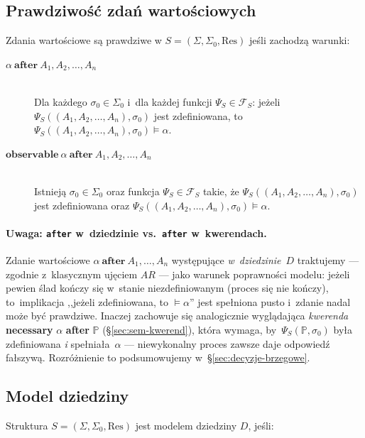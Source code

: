 \documentclass[11pt,a4paper]{article}
\newcommand{\aft}{\textbf{after}}
\newcommand{\necessary}{\textbf{necessary}}
\theoremstyle{definition}
\begin{document}
\subsection{Prawdziwość zdań wartościowych}
\label{sec:prawdziwosc-zdan-wartosciowych}

Zdania wartościowe są prawdziwe w $S = (\Sigma, \Sigma_0, \mathrm{Res})$ jeśli zachodzą warunki:

\begin{description}
    \item[$\alpha \ \textbf{after} \ A_1, A_2, \dots, A_n$] \hfill \\
        Dla każdego $\sigma_0 \in \Sigma_0$ i~dla każdej funkcji $\Psi_S \in \mathcal{F}_S$: jeżeli $\Psi_S((A_1, A_2, \dots, A_n), \sigma_0)$ jest zdefiniowana, to~$\Psi_S((A_1, A_2, \dots, A_n), \sigma_0) \models \alpha$.
    \item[$\textbf{observable} \  \alpha \ \textbf{after} \ A_1, A_2, \dots, A_n$] \hfill \\
        Istnieją $\sigma_0 \in \Sigma_0$ oraz funkcja $\Psi_S \in \mathcal{F}_S$ takie, że $\Psi_S((A_1, A_2, \dots, A_n), \sigma_0)$ jest zdefiniowana oraz $\Psi_S((A_1, A_2, \dots, A_n), \sigma_0) \models \alpha$.
\end{description}

\paragraph{Uwaga: \texttt{after} w~dziedzinie vs.\ \texttt{after} w~kwerendach.}
Zdanie wartościowe $\alpha\ \aft\ A_1,\dots,A_n$ występujące \emph{w~dziedzinie}~$D$ traktujemy --- zgodnie z~klasycznym ujęciem $AR$ --- jako warunek poprawności modelu: jeżeli pewien ślad kończy się w~stanie niezdefiniowanym (proces się nie kończy), to~implikacja ,,jeżeli zdefiniowana, to $\models\alpha$'' jest spełniona pusto i~zdanie nadal może być prawdziwe. Inaczej zachowuje się analogicznie wyglądająca \emph{kwerenda} \necessary{} $\alpha$ \aft{} $\mathbb{P}$ (§\ref{sec:sem-kwerend}), która wymaga, by~$\Psi_S(\mathbb{P},\sigma_0)$ była zdefiniowana \emph{i} spełniała~$\alpha$ --- niewykonalny proces zawsze daje odpowiedź fałszywą. Rozróżnienie to podsumowujemy w~§\ref{sec:decyzje-brzegowe}.

\subsection{Model dziedziny}
\label{sec:model-dziedziny}

Struktura $S = (\Sigma, \Sigma_0, \mathrm{Res})$ jest modelem dziedziny $D$, jeśli:
\end{document}
